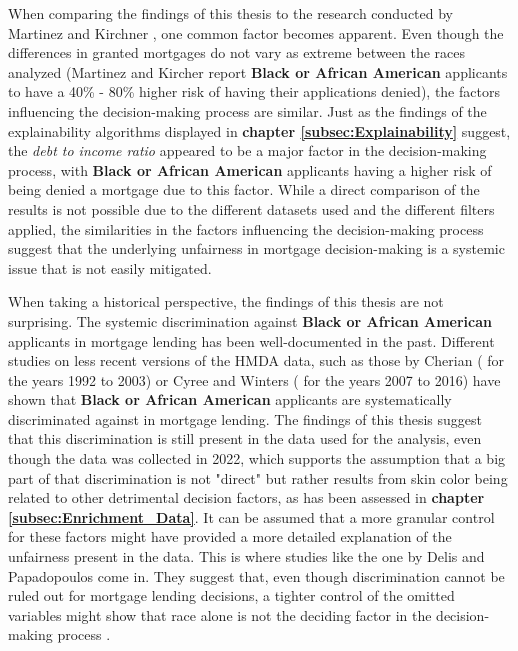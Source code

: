 When comparing the findings of this thesis to the research conducted by Martinez and Kirchner \parencite{Martinez2021}, one common factor becomes apparent. Even though the differences in granted mortgages do not vary as extreme between the races analyzed (Martinez and Kircher report \textbf{Black or African American} applicants to have a 40\% - 80\% higher risk of having their applications denied), the factors influencing the decision-making process are similar.
Just as the findings of the explainability algorithms displayed in \textbf{chapter \ref{subsec:Explainability}} suggest, the \textit{debt to income ratio} appeared to be a major factor in the decision-making process, with \textbf{Black or African American} applicants having a higher risk of being denied a mortgage due to this factor.
While a direct comparison of the results is not possible due to the different datasets used and the different filters applied, the similarities in the factors influencing the decision-making process suggest that the underlying unfairness in mortgage decision-making is a systemic issue that is not easily mitigated.

When taking a historical perspective, the findings of this thesis are not surprising. The systemic discrimination against \textbf{Black or African American} applicants in mortgage lending has been well-documented in the past. 
Different studies on less recent versions of the HMDA data, such as those by Cherian (\cite{Cherian2014} for the years 1992 to 2003) or Cyree and Winters (\cite{Cyree2023} for the years 2007 to 2016) have shown that \textbf{Black or African American} applicants are systematically discriminated against in mortgage lending.
The findings of this thesis suggest that this discrimination is still present in the data used for the analysis, even though the data was collected in 2022, which supports the assumption that a big part of that discrimination is not "direct" but rather results from skin color being related to other detrimental decision factors, as has been assessed in \textbf{chapter \ref{subsec:Enrichment_Data}}.
It can be assumed that a more granular control for these factors might have provided a more detailed explanation of the unfairness present in the data. This is where studies like the one by Delis and Papadopoulos come in. They suggest that, even though discrimination cannot be ruled out for mortgage lending decisions, a tighter control of the omitted variables might show that race alone is not the deciding factor in the decision-making process \parencite{Delis2019}.

